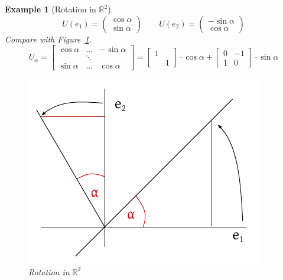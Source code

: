 \documentclass[a4paper]{article}
\numberwithin{lecref}{section}
\newtheorem*{Example}{Example}
\newcommand{\vectwo}[2]{\begin{pmatrix} #1 \\ #2 \end{pmatrix}}
\begin{document}
\begin{Example}[Rotation in $\mathbb R^2$]
  \[ U(e_1) = \vectwo{\cos\alpha}{\sin\alpha} \qquad
     U(e_2) = \vectwo{-\sin\alpha}{\cos\alpha} \]
  Compare with Figure~\ref{img:rotr2}.
  \[
    U_{\alpha} = \begin{bmatrix}
      \cos\alpha & \dots & -\sin\alpha \\
                 & \ddots & \\
      \sin\alpha & \dots & \cos\alpha
    \end{bmatrix}
    = \begin{bmatrix} 1 & \\ & 1 \end{bmatrix} \cdot \cos{\alpha} + \begin{bmatrix} 0 & -1 \\ 1 & 0 \end{bmatrix} \cdot \sin\alpha
  \]
  \begin{figure}[t]
    \begin{center}
      \includegraphics{img/13_rotation.pdf}
      \caption{Rotation in $\mathbb R^2$}
      \label{img:rotr2}
    \end{center}
  \end{figure}
\end{Example}
\end{document}
